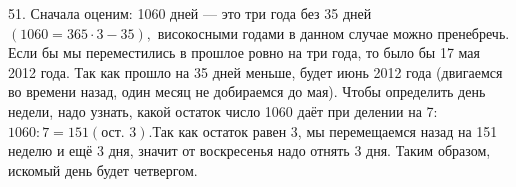 51. Сначала оценим: 1060 дней --- это три года без 35 дней $(1060=365\cdot3-35),$ високосными годами в данном случае можно пренебречь. Если бы мы переместились в прошлое ровно на три года, то было бы 17 мая 2012 года. Так как прошло на 35 дней меньше, будет июнь 2012 года (двигаемся во времени назад, один месяц не добираемся до мая). Чтобы определить день недели, надо узнать, какой остаток число 1060 даёт при делении на 7: $1060:7=151 (\text{ост. } 3).$Так как остаток равен 3, мы перемещаемся назад на 151 неделю и ещё 3 дня, значит от воскресенья надо отнять 3 дня. Таким образом, искомый день будет четвергом.\\
